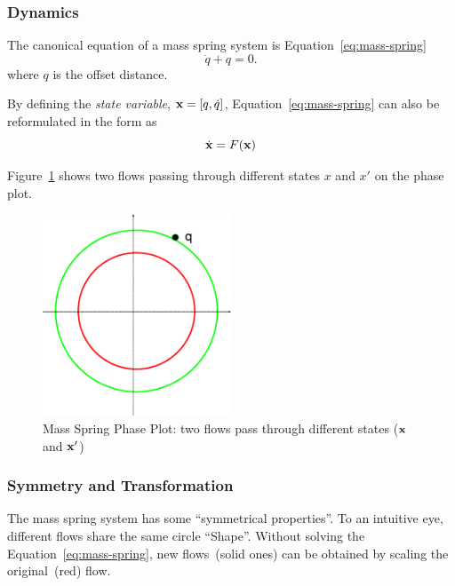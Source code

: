 \subsubsection*{Dynamics}
The canonical equation of a mass spring system is Equation~\ref{eq:mass-spring}
\begin{equation}
\label{eq:mass-spring}
\ddot{q}+q=0.
\end{equation}
where $q$ is the offset distance.

By defining the \emph{state variable}, $\mathbf{x}=[q,\dot{q}]$, Equation~\ref{eq:mass-spring} can also be reformulated in the form as
\[
\dot{\mathbf{x}}=F(\mathbf{x})
\]

Figure~\ref{fig:massSpringPhasePlot} shows two flows passing through different states $x$ and $x'$ on the phase plot.


\begin{figure}[!htbp]
  \begin{center}
     \includegraphics[width=0.5\textwidth]{MassSpringPhasePlot}
    \caption{Mass Spring Phase Plot: two flows pass through different states ($\mathbf{x}$ and ${\mathbf{x}}'$)}
    \label{fig:massSpringPhasePlot}  
  \end{center}
\end{figure}

\subsubsection*{Symmetry and Transformation}

The mass spring system has some ``symmetrical properties''.
To an intuitive eye, different flows share the same circle ``Shape''.
Without solving the Equation~\ref{eq:mass-spring}, new flows~(solid ones) can be obtained by scaling the original~(red) flow.

